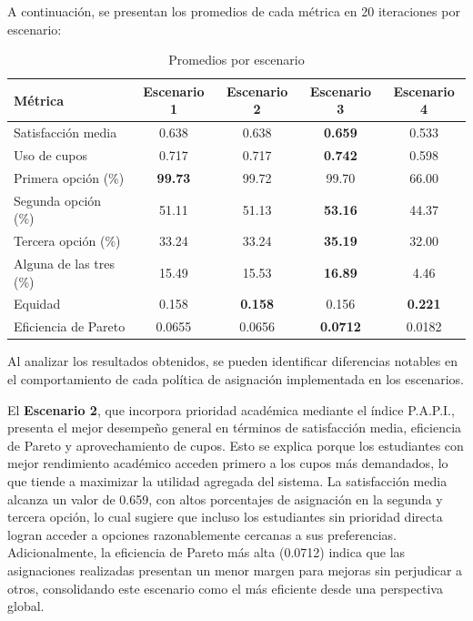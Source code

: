 \documentclass{article}
\begin{document}
A continuación, se presentan los promedios de cada métrica en 20 iteraciones por escenario:

\begin{table}[H]
\centering
\caption{Promedios por escenario}
\begin{tabular}{lcccc}
\toprule
\textbf{Métrica} & \textbf{Escenario 1} & \textbf{Escenario 2} & \textbf{Escenario 3} & \textbf{Escenario 4} \\
\midrule
Satisfacción media & 0.638 & 0.638 & \textbf{0.659} & 0.533 \\
Uso de cupos & 0.717 & 0.717 & \textbf{0.742} & 0.598 \\
Primera opción (\%) & \textbf{99.73} & 99.72 & 99.70 & 66.00 \\
Segunda opción (\%) & 51.11 & 51.13 & \textbf{53.16} & 44.37 \\
Tercera opción (\%) & 33.24 & 33.24 & \textbf{35.19} & 32.00 \\
Alguna de las tres (\%) & 15.49 & 15.53 & \textbf{16.89} & 4.46 \\
Equidad & 0.158 & \textbf{0.158} & 0.156 & \textbf{0.221} \\
Eficiencia de Pareto & 0.0655 & 0.0656 & \textbf{0.0712} & 0.0182 \\
\bottomrule
\end{tabular}
\end{table}

\noindent Al analizar los resultados obtenidos, se pueden identificar diferencias notables en el comportamiento de cada política de asignación implementada en los escenarios.

El \textbf{Escenario 2}, que incorpora prioridad académica mediante el índice P.A.P.I., presenta el mejor desempeño general en términos de satisfacción media, eficiencia de Pareto y aprovechamiento de cupos. Esto se explica porque los estudiantes con mejor rendimiento académico acceden primero a los cupos más demandados, lo que tiende a maximizar la utilidad agregada del sistema. La satisfacción media alcanza un valor de 0.659, con altos porcentajes de asignación en la segunda y tercera opción, lo cual sugiere que incluso los estudiantes sin prioridad directa logran acceder a opciones razonablemente cercanas a sus preferencias. Adicionalmente, la eficiencia de Pareto más alta (0.0712) indica que las asignaciones realizadas presentan un menor margen para mejoras sin perjudicar a otros, consolidando este escenario como el más eficiente desde una perspectiva global.
\end{document}
